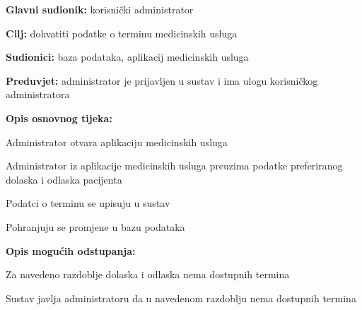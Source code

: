                         \noindent {}
					\begin{packed_item}
	
						\item \textbf{Glavni sudionik: }korisnički administrator
						\item  \textbf{Cilj:} dohvatiti podatke o terminu medicinskih usluga
						\item  \textbf{Sudionici:} baza podataka, aplikacij medicinskih usluga
						\item  \textbf{Preduvjet:} administrator je prijavljen u sustav i ima ulogu korisničkog administratora
						\item  \textbf{Opis osnovnog tijeka:}
						
						\item[] \begin{packed_enum}

                                \item Administrator otvara aplikaciju medicinskih usluga
							\item Administrator iz aplikacije medicinskih usluga preuzima podatke preferiranog dolaska i odlaska pacijenta
                                \item Podatci o terminu se upisuju u sustav
                                \item Pohranjuju se promjene u bazu podataka
						\end{packed_enum}
						
						\item  \textbf{Opis mogućih odstupanja:}
						
						\item[] \begin{packed_item}
	
							\item[2.a] Za navedeno razdoblje dolaska i odlaska nema dostupnih termina
							\item[] \begin{packed_enum}
								
								\item Sustav javlja administratoru da u navedenom razdoblju nema dostupnih termina
								
							\end{packed_enum}
							
						\end{packed_item}
					\end{packed_item}

